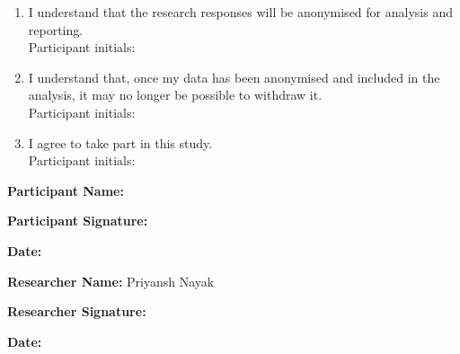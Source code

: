 \begin{enumerate}
\item I understand that the research responses will be anonymised for analysis and reporting.\\[0.5em]
Participant initials: \hrulefill

\item I understand that, once my data has been anonymised and included in the analysis, it may no longer be possible to withdraw it.\\[0.5em]
Participant initials: \hrulefill

\item I agree to take part in this study.\\[0.5em]
Participant initials: \hrulefill
\end{enumerate}

\vspace{1.5em}

\textbf{Participant Name:} \hrulefill

\textbf{Participant Signature:} \hrulefill

\textbf{Date:} \hrulefill

\vspace{1.5em}

\textbf{Researcher Name:} Priyansh Nayak

\textbf{Researcher Signature:} \hrulefill

\textbf{Date:} \hrulefill

\endgroup
